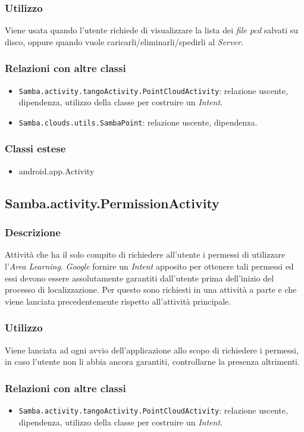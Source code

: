 \subsubsection{Utilizzo}
Viene usata quando l'utente richiede di visualizzare la lista dei \emph{file pcd} salvati su disco, oppure quando vuole caricarli/eliminarli/spedirli al \emph{Server}.
\subsubsection{Relazioni con altre classi}
\begin{itemize}
	\item \texttt{Samba.activity.tangoActivity.PointCloudActivity}: relazione uscente, dipendenza, utilizzo della classe per costruire un \emph{Intent}.
	\item \texttt{Samba.clouds.utils.SambaPoint}: relazione uscente, dipendenza.
\end{itemize}
\subsubsection{Classi estese}
\begin{itemize}
	\item android.app.Activity
\end{itemize}

\subsection{Samba.activity.PermissionActivity}
\subsubsection{Descrizione}
Attività che ha il solo compito di richiedere all'utente i permessi di utilizzare l'\emph{Area Learning}. \emph{Google} fornire un \emph{Intent} apposito per ottenere tali permessi ed essi devono essere assolutamente garantiti dall'utente prima dell'inizio del processo di localizzazione. Per questo sono richiesti in una attività a parte e che viene lanciata precedentemente rispetto all'attività principale.
\subsubsection{Utilizzo}
Viene lanciata ad ogni avvio dell'applicazione allo scopo di richiedere i permessi, in caso l'utente non li abbia ancora garantiti, controllarne la presenza altrimenti.
\subsubsection{Relazioni con altre classi}
\begin{itemize}
	\item \texttt{Samba.activity.tangoActivity.PointCloudActivity}: relazione uscente, dipendenza, utilizzo della classe per costruire un \emph{Intent}.
\end{itemize}
